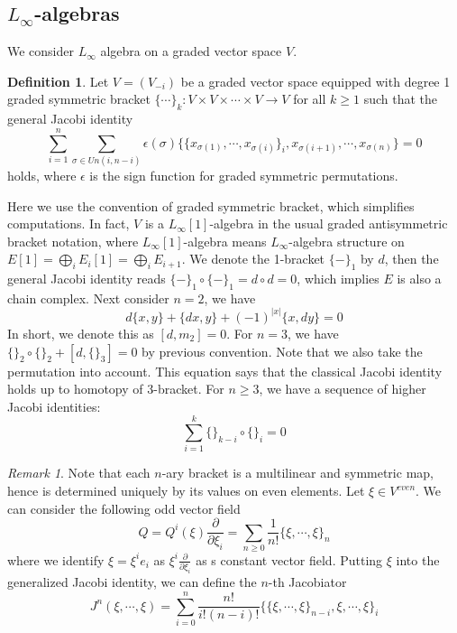 \documentclass[12pt]{amsart}
\theoremstyle{definition}
\newtheorem{defn}[thm]{Definition}
\theoremstyle{remark}
\newtheorem{rem}[thm]{Remark}
\numberwithin{equation}{section}
\newcommand{\del}{\partial}
\renewcommand{\del}{\partial}
\newcommand{\1}{{\mathbb{1}}}
\begin{document}
\subsection{$L_{\infty}$-algebras}

We consider $L_{\infty}$ algebra on a graded vector space $V$. 

\begin{defn}
	Let $V=(V_{-i})$ be a graded vector space equipped with degree 1 graded symmetric bracket $\{\cdots\}_k: V\times V\times \cdots \times V \to V$ for all $k\ge 1$ such that the general Jacobi identity
	\begin{equation*}
	\sum_{i=1}^n \sum_{\sigma\in Un(i,n-i) }\epsilon(\sigma) \big\{\{ x_{\sigma(1)},\cdots, x_{\sigma(i)} \}_i, x_{\sigma(i+1)}, \cdots, x_{\sigma(n)} \big\}=0
	\end{equation*} holds, where $\epsilon$ is the sign function for graded symmetric permutations. 
\end{defn}Here we use the convention of graded symmetric bracket, which simplifies computations. In fact, $V$ is a $L_{\infty}[1]$-algebra in the usual graded antisymmetric bracket notation, where $L_{\infty}[1]$-algebra means $L_{\infty}$-algebra structure on $E[1]=\bigoplus_i E_i[1]=\bigoplus_i E_{i+1}$. We denote the 1-bracket $\{-\}_1$ by $d$, then the general Jacobi identity reads $\{-\}_1\circ \{-\}_1=d\circ d=0$, which implies $E$ is also a chain complex. Next consider $n=2$, we have 
\begin{equation*}
d\{x,y\}+\{dx,y\}+(-1)^{|x|}\{x,dy\}=0
\end{equation*} 
In short, we denote this as  $[d,m_2]=0$. For $n=3$, we have $\{\}_2\circ \{\}_2+[d,\{\}_3]=0$ by previous convention. Note that we also take the permutation into account. This equation says that the classical Jacobi identity holds up to homotopy of 3-bracket. For $n\ge 3$, we have a sequence of higher Jacobi identities:
\begin{equation*}
\sum_{i=1}^k\{\}_{k-i}\circ \{\}_i=0
\end{equation*}  
\begin{rem}
	Note that each $n$-ary bracket is a  multilinear and symmetric map, hence is determined uniquely by its values on even elements. Let $\xi \in V^{even}$. We can consider the following odd vector field
	\begin{equation*}
	Q=Q^i(\xi)\frac{\del}{\del \xi_i}=\sum_{n \ge 0} \frac{1}{n!}\{\xi, \cdots, \xi \}_n
	\end{equation*}
	where we identify $\xi=\xi^ie_i$ as $\xi^i\frac{\del}{\del \xi_i}$ as s constant vector field. Putting $\xi$ into the generalized Jacobi identity, we can define the $n$-th Jacobiator 
	\begin{equation*}
	J^n(\xi, \cdots, \xi)=\sum_{i=0}^n \frac{n!}{i!(n-i)!}\big\{ \{\xi,\cdots, \xi \}_{n-i}, \xi,\cdots ,\xi  \big\}_{i}
	\end{equation*}
\end{rem}
\end{document}
